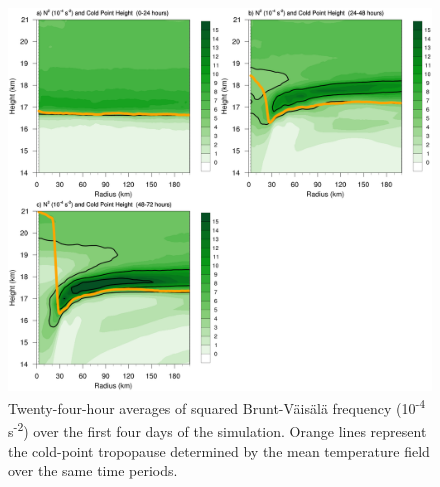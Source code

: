 \documentclass{ametsoc}
\begin{document}
\begin{figure}[ht]
\centerline{\includegraphics[width=39pc]{figures/n2-24hr-avgs.png}}
\caption{Twenty-four-hour averages of squared Brunt-V{\"a}is{\"a}l{\"a} frequency (10\textsuperscript{-4} s\textsuperscript{-2}) over the first four days of the simulation. Orange lines represent the cold-point tropopause determined by the mean temperature field over the same time periods.}
\label{fig:n2-24hr-avgs}
\end{figure}
\end{document}

